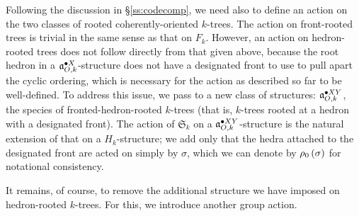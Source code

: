 \documentclass[sectionflow,singlespace,twoside,boldmathhdr]{brandiss} %
\numberwithin{section}{chapter}
\numberwithin{figure}{chapter}
\begin{document}
Following the discussion in \S \ref{ss:codecomp}, we need also to define an action on the two classes of rooted coherently-oriented $k$-trees.
The action on front-rooted trees is trivial in the same sense as that on $F_{k}$.
However, an action on hedron-rooted trees does not follow directly from that given above, because the root hedron in a $\pointed[X]{\mathfrak{a}}_{O, k}$-structure does not have a designated front to use to pull apart the cyclic ordering, which is necessary for the action as described so far to be well-defined.
To address this issue, we pass to a new class of structures: $\pointed[XY]{\mathfrak{a}}_{O, k}$, the species of fronted-hedron-rooted $k$-trees (that is, $k$-trees rooted at a hedron with a designated front).
The action of $\mathfrak{S}_{k}$ on a $\pointed[XY]{\mathfrak{a}}_{O, k}$-structure is the natural extension of that on a $H_{k}$-structure; we add only that the hedra attached to the designated front are acted on simply by $\sigma$, which we can denote by $\rho_{0} \pbrac{\sigma}$ for notational consistency.

It remains, of course, to remove the additional structure we have imposed on hedron-rooted $k$-trees.
For this, we introduce another group action.
\end{document}
